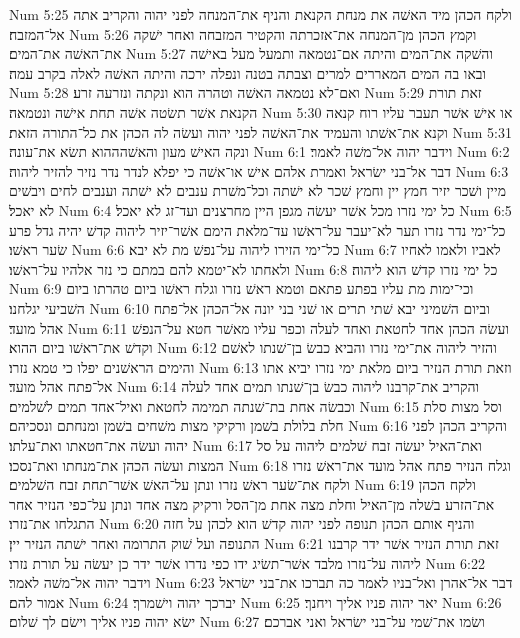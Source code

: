 Num 5:25  ולקח הכהן מיד האשׁה את מנחת הקנאת והניף את־המנחה לפני יהוה והקריב אתה אל־המזבח׃
Num 5:26  וקמץ הכהן מן־המנחה את־אזכרתה והקטיר המזבחה ואחר ישׁקה את־האשׁה את־המים׃
Num 5:27  והשׁקה את־המים והיתה אם־נטמאה ותמעל מעל באישׁה ובאו בה המים המאררים למרים וצבתה בטנה ונפלה ירכה והיתה האשׁה לאלה בקרב עמה׃
Num 5:28  ואם־לא נטמאה האשׁה וטהרה הוא ונקתה ונזרעה זרע׃
Num 5:29  זאת תורת הקנאת אשׁר תשׂטה אשׁה תחת אישׁה ונטמאה׃
Num 5:30  או אישׁ אשׁר תעבר עליו רוח קנאה וקנא את־אשׁתו והעמיד את־האשׁה לפני יהוה ועשׂה לה הכהן את כל־התורה הזאת׃
Num 5:31  ונקה האישׁ מעון והאשׁהההוא תשׂא את־עונה׃
Num 6:1  וידבר יהוה אל־משׁה לאמר׃
Num 6:2  דבר אל־בני ישׂראל ואמרת אלהם אישׁ או־אשׁה כי יפלא לנדר נדר נזיר להזיר ליהוה׃
Num 6:3  מיין ושׁכר יזיר חמץ יין וחמץ שׁכר לא ישׁתה וכל־משׁרת ענבים לא ישׁתה וענבים לחים ויבשׁים לא יאכל׃
Num 6:4  כל ימי נזרו מכל אשׁר יעשׂה מגפן היין מחרצנים ועד־זג לא יאכל׃
Num 6:5  כל־ימי נדר נזרו תער לא־יעבר על־ראשׁו עד־מלאת הימם אשׁר־יזיר ליהוה קדשׁ יהיה גדל פרע שׂער ראשׁו׃
Num 6:6  כל־ימי הזירו ליהוה על־נפשׁ מת לא יבא׃
Num 6:7  לאביו ולאמו לאחיו ולאחתו לא־יטמא להם במתם כי נזר אלהיו על־ראשׁו׃
Num 6:8  כל ימי נזרו קדשׁ הוא ליהוה׃
Num 6:9  וכי־ימות מת עליו בפתע פתאם וטמא ראשׁ נזרו וגלח ראשׁו ביום טהרתו ביום השׁביעי יגלחנו׃
Num 6:10  וביום השׁמיני יבא שׁתי תרים או שׁני בני יונה אל־הכהן אל־פתח אהל מועד׃
Num 6:11  ועשׂה הכהן אחד לחטאת ואחד לעלה וכפר עליו מאשׁר חטא על־הנפשׁ וקדשׁ את־ראשׁו ביום ההוא׃
Num 6:12  והזיר ליהוה את־ימי נזרו והביא כבשׂ בן־שׁנתו לאשׁם והימים הראשׁנים יפלו כי טמא נזרו׃
Num 6:13  וזאת תורת הנזיר ביום מלאת ימי נזרו יביא אתו אל־פתח אהל מועד׃
Num 6:14  והקריב את־קרבנו ליהוה כבשׂ בן־שׁנתו תמים אחד לעלה וכבשׂה אחת בת־שׁנתה תמימה לחטאת ואיל־אחד תמים לשׁלמים׃
Num 6:15  וסל מצות סלת חלת בלולת בשׁמן ורקיקי מצות משׁחים בשׁמן ומנחתם ונסכיהם׃
Num 6:16  והקריב הכהן לפני יהוה ועשׂה את־חטאתו ואת־עלתו׃
Num 6:17  ואת־האיל יעשׂה זבח שׁלמים ליהוה על סל המצות ועשׂה הכהן את־מנחתו ואת־נסכו׃
Num 6:18  וגלח הנזיר פתח אהל מועד את־ראשׁ נזרו ולקח את־שׂער ראשׁ נזרו ונתן על־האשׁ אשׁר־תחת זבח השׁלמים׃
Num 6:19  ולקח הכהן את־הזרע בשׁלה מן־האיל וחלת מצה אחת מן־הסל ורקיק מצה אחד ונתן על־כפי הנזיר אחר התגלחו את־נזרו׃
Num 6:20  והניף אותם הכהן תנופה לפני יהוה קדשׁ הוא לכהן על חזה התנופה ועל שׁוק התרומה ואחר ישׁתה הנזיר יין׃
Num 6:21  זאת תורת הנזיר אשׁר ידר קרבנו ליהוה על־נזרו מלבד אשׁר־תשׂיג ידו כפי נדרו אשׁר ידר כן יעשׂה על תורת נזרו׃
Num 6:22  וידבר יהוה אל־משׁה לאמר׃
Num 6:23  דבר אל־אהרן ואל־בניו לאמר כה תברכו את־בני ישׂראל אמור להם׃
Num 6:24  יברכך יהוה וישׁמרך׃
Num 6:25  יאר יהוה פניו אליך ויחנך׃
Num 6:26  ישׂא יהוה פניו אליך וישׂם לך שׁלום׃
Num 6:27  ושׂמו את־שׁמי על־בני ישׂראל ואני אברכם׃
